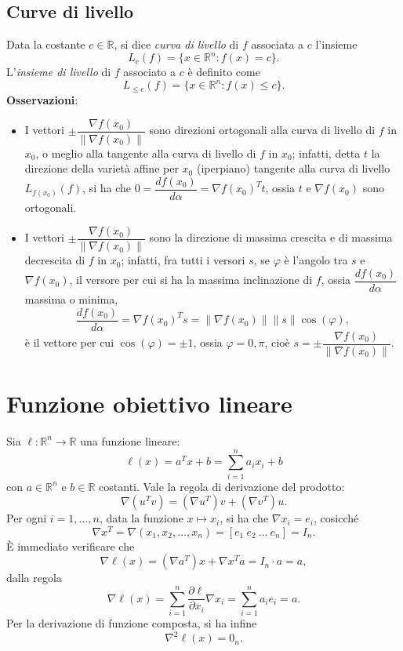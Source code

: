 \subsection{Curve di livello}
Data la costante $c \in \mathbb{R}$, si dice \emph{curva di livello} di $f$ associata a $c$ l’insieme
\[
L_c(f) = \{x \in \mathbb{R}^n : f(x) = c\}.
\]
L’\emph{insieme di livello} di $f$ associato a $c$ è definito come
\[
L_{\leq c}(f) = \{x \in \mathbb{R}^n : f(x) \leq c\}.
\]
\noindent\textbf{Osservazioni}:
\begin{itemize}
    \item I vettori $\pm \dfrac{\nabla f(x_0)}{\|\nabla f(x_0)\|}$ sono direzioni ortogonali alla curva di livello di $f$ in $x_0$, o meglio alla tangente alla curva di livello di $f$ in $x_0$; infatti, detta $t$ la direzione della varietà affine per $x_0$ (iperpiano) tangente alla curva di livello $L_{f(x_0)}(f)$, si ha che $0 = \dfrac{df(x_0)}{d\alpha} = \nabla f(x_0)^T t$, ossia $t$ e $\nabla f(x_0)$ sono ortogonali.
    
    \item I vettori $\pm \dfrac{\nabla f(x_0)}{\|\nabla f(x_0)\|}$ sono la direzione di massima crescita e di massima decrescita di $f$ in $x_0$; infatti, fra tutti i versori $s$, se $\varphi$ è l’angolo tra $s$ e $\nabla f(x_0)$, il versore per cui si ha la massima inclinazione di $f$, ossia $\dfrac{df(x_0)}{d\alpha}$ massima o minima,
    \[
    \dfrac{df(x_0)}{d\alpha} = \nabla f(x_0)^T s = \|\nabla f(x_0)\| \|s\| \cos(\varphi),
    \]
    è il vettore per cui $\cos(\varphi) = \pm 1$, ossia $\varphi = 0, \pi$, cioè $s = \pm \dfrac{\nabla f(x_0)}{\|\nabla f(x_0)\|}$.
\end{itemize}

\section{Funzione obiettivo lineare}
Sia $\ell : \mathbb{R}^n \to \mathbb{R}$ una funzione lineare:
\[
\ell(x) = a^T x + b = \sum_{i=1}^{n} a_i x_i + b
\]
con $a \in \mathbb{R}^n$ e $b \in \mathbb{R}$ costanti.
\noindent Vale la regola di derivazione del prodotto:
\[
\nabla(u^T v) = (\nabla u^T)v + (\nabla v^T)u.
\]
Per ogni $i = 1, \ldots, n$, data la funzione $x \mapsto x_i$, si ha che $\nabla x_i = e_i$, cosicché
\[
\nabla x^T = \nabla(x_1, x_2, \ldots, x_n) = [e_1 \ e_2 \ \ldots \ e_n] = I_n.
\]
\noindent È immediato verificare che
\[
\nabla \ell(x) = (\nabla a^T)x + \nabla x^T a = I_n \cdot a = a,
\]
dalla regola
\[
\nabla \ell(x) = \sum_{i=1}^{n} \frac{\partial \ell}{\partial x_i} \nabla x_i = \sum_{i=1}^{n} a_i e_i = a.
\]
\noindent Per la derivazione di funzione composta, si ha infine
\[
\nabla^2 \ell(x) = 0_n.
\]
